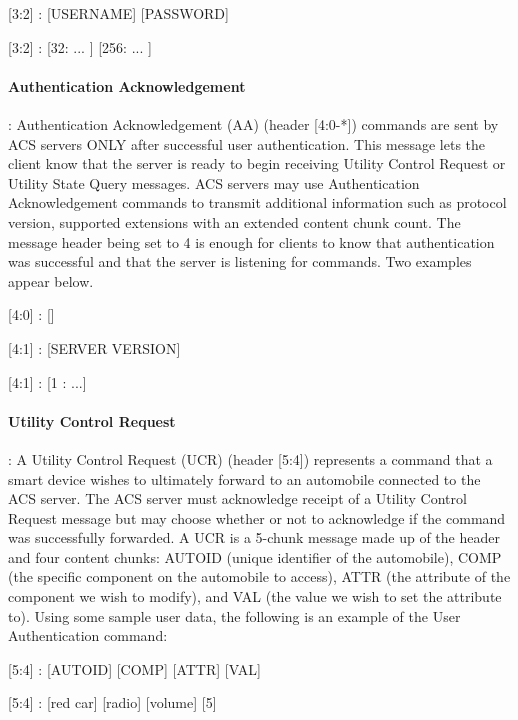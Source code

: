 \begin{center}
{\textsf{[3:2] : [USERNAME] [PASSWORD]}}

{\textsf{[3:2] : [32: ... ] [256: ... ]}}
\end{center}

\paragraph{Authentication Acknowledgement}: Authentication Acknowledgement (AA) (header [4:0-*]) commands are sent by ACS servers ONLY after successful user authentication. This message lets the client know that the server is ready to begin receiving Utility Control Request or Utility State Query messages. ACS servers may use Authentication Acknowledgement commands to transmit additional information such as protocol version, supported extensions with an extended content chunk count. The message header being set to 4 is enough for clients to know that authentication was successful and that the server is listening for commands. Two examples appear below.

\begin{center}
{\textsf{[4:0] : []}}

{\textsf{[4:1] : [SERVER VERSION]}}

{\textsf{[4:1] : [1 : ...]}}
\end{center}

\paragraph{Utility Control Request}: A Utility Control Request (UCR) (header [5:4]) represents a command that a smart device wishes to ultimately forward to an automobile connected to the ACS server. The ACS server must acknowledge receipt of a Utility Control Request message but may choose whether or not to acknowledge if the command was successfully forwarded. A UCR is a 5-chunk message made up of the header and four content chunks: AUTOID (unique identifier of the automobile), COMP (the specific component on the automobile to access), ATTR (the attribute of the component we wish to modify), and VAL (the value we wish to set the attribute to). Using some sample user data, the following is an example of the User Authentication command:

\begin{center}
{\textsf{[5:4] : [AUTOID] [COMP] [ATTR] [VAL]}}

{\textsf{[5:4] : [red car] [radio] [volume] [5]}}
\end{center}

